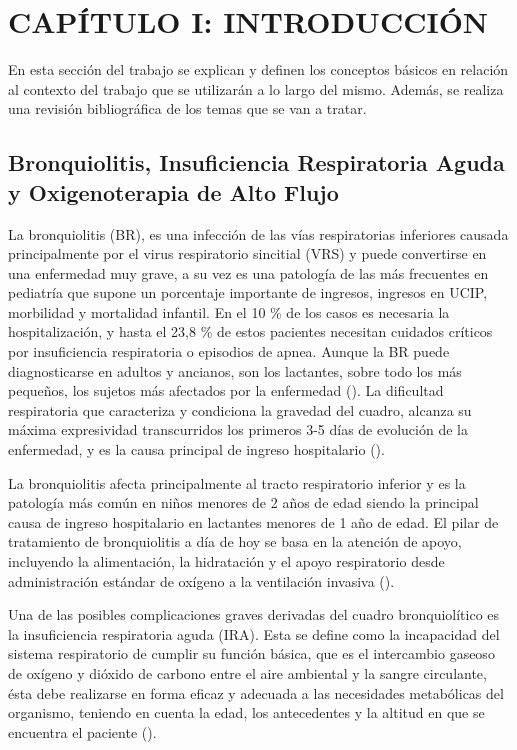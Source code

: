 \section{CAPÍTULO I: INTRODUCCIÓN}\label{sec:introduction}

En esta sección del trabajo se explican y definen los conceptos básicos en relación al contexto del trabajo que se utilizarán a lo largo del mismo. Además, se realiza una revisión bibliográfica de los temas que se van a tratar.

\subsection{Bronquiolitis, Insuficiencia Respiratoria Aguda y Oxigenoterapia de Alto Flujo}

La bronquiolitis (BR), es una infección de las vías respiratorias inferiores causada principalmente por el virus respiratorio sincitial (VRS) y puede convertirse en una enfermedad muy grave, a su vez es una patología de las más frecuentes en pediatría que supone un porcentaje importante de ingresos, ingresos en UCIP, morbilidad y mortalidad infantil. En el 10 \% de los casos es necesaria la hospitalización, y hasta el 23,8 \% de estos pacientes necesitan cuidados críticos por insuficiencia respiratoria o episodios de apnea. Aunque la BR puede diagnosticarse en adultos y ancianos, son los lactantes, sobre todo los más pequeños, los sujetos más afectados por la enfermedad (\cite{Fainardi2021}). La dificultad respiratoria que caracteriza y condiciona la gravedad del cuadro, alcanza su máxima expresividad transcurridos los primeros 3-5 días de evolución de la enfermedad, y es la causa principal de ingreso hospitalario (\cite{Patel2003}).

La bronquiolitis afecta principalmente al tracto respiratorio inferior y es la patología más común en niños menores de 2 años de edad siendo la principal causa de ingreso hospitalario en lactantes menores de 1 año de edad. El pilar de tratamiento de bronquiolitis a día de hoy se basa en la atención de apoyo, incluyendo la alimentación, la hidratación y el apoyo respiratorio desde administración estándar de oxígeno a la ventilación invasiva (\cite{Daverio2019}).

Una de las posibles complicaciones graves derivadas del cuadro bronquiolítico es la insuficiencia respiratoria aguda (IRA). Esta se define como la incapacidad del sistema respiratorio de cumplir su función básica, que es el intercambio gaseoso de oxígeno y dióxido de carbono entre el aire ambiental y la sangre circulante, ésta debe realizarse en forma eficaz y adecuada a las necesidades metabólicas del organismo, teniendo en cuenta la edad, los antecedentes y la altitud en que se encuentra el paciente (\cite{FernandoR2010}). 

